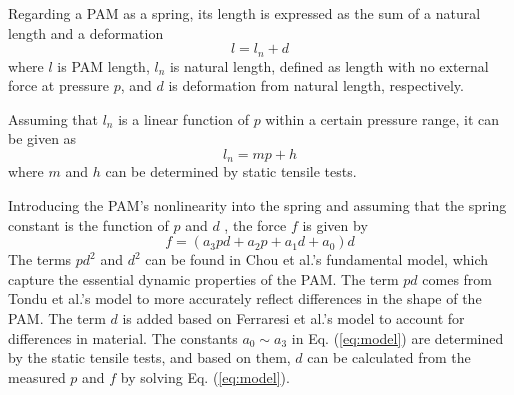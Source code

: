 Regarding a PAM as a spring\cite{spring}, its length is expressed as the sum of a natural length and a deformation
\begin{equation}
   l = l_n + d
\label{eq:estimation}
\end{equation}
where $l$ is PAM length, $l_n$ is natural length, defined as length with no external force at pressure $p$, and $d$ is deformation from natural length, respectively.
 
Assuming that $l_n$ is a linear function of $p$ within a certain pressure range, it can be given as
\begin{equation}
l_n = mp + h
\label{eq:L_n}
\end{equation}
where $m$ and $h$ can be determined by static tensile tests.
 
Introducing the PAM's nonlinearity into the spring and assuming that the spring constant is the function of $p$ and $d$ \cite{spring}, the force $f$ is given by
\begin{equation}
\label{eq:model}
f = (a_3pd + a_2p + a_1d + a_0)d
\end{equation}
The terms $pd^2$ and $d^2$ can be found in Chou et al.'s fundamental model\cite{chouMeasurementModelingMcKibben1996}, which capture the essential dynamic properties of the PAM. The term $pd$  comes from Tondu et al.'s model\cite{ModelingControl} to more accurately reflect differences in the shape of the PAM. The term $d$ is added based on Ferraresi et al.'s model\cite{Comparison} to account for differences in material. The constants $a_0 \sim a_3$ in Eq. (\ref{eq:model}) are determined by the static tensile tests, and based on them, $d$  can be calculated from the measured $p$ and $f$ by solving Eq. (\ref{eq:model}).
